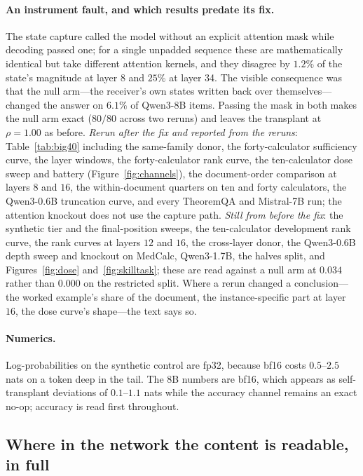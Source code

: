 \documentclass{article}
\begin{document}
\paragraph{An instrument fault, and which results predate its fix.} The state
capture called the model without an explicit attention mask while decoding
passed one; for a single unpadded sequence these are mathematically identical
but take different attention kernels, and they disagree by $1.2\%$ of the
state's magnitude at layer 8 and $25\%$ at layer 34. The visible consequence was
that the null arm---the receiver's own states written back over
themselves---changed the answer on $6.1\%$ of Qwen3-8B items. Passing the mask in
both makes the null arm exact ($80/80$ across two reruns) and leaves the transplant at
$\rho = 1.00$ as before. \emph{Rerun after the fix and reported from the
reruns}: Table~\ref{tab:big40} including the same-family donor, the
forty-calculator sufficiency curve, the layer windows, the forty-calculator rank
curve, the ten-calculator dose sweep and battery (Figure~\ref{fig:channels}),
the document-order comparison at layers $8$ and $16$, the within-document
quarters on ten and forty calculators, the Qwen3-0.6B truncation curve, and
every TheoremQA and Mistral-7B run; the attention knockout does not use the
capture path. \emph{Still from before the fix}: the synthetic tier and the
final-position sweeps, the ten-calculator development rank curve, the rank
curves at layers $12$ and $16$, the cross-layer donor, the Qwen3-0.6B depth
sweep and knockout on MedCalc, Qwen3-1.7B, the halves split, and
Figures~\ref{fig:dose} and~\ref{fig:skilltask}; these are read against a null
arm at $0.034$ rather than $0.000$ on the restricted split. Where a rerun
changed a conclusion---the worked example's share of the document, the
instance-specific part at layer $16$, the dose curve's shape---the text says
so.

\paragraph{Numerics.} Log-probabilities on the synthetic control are fp32,
because bf16 costs $0.5$--$2.5$ nats on a token deep in the tail. The 8B numbers
are bf16, which appears as self-transplant deviations of $0.1$--$1.1$ nats while
the accuracy channel remains an exact no-op; accuracy is read first throughout.




\subsection{Where in the network the content is readable, in full}
\label{app:where}
\end{document}
